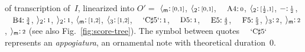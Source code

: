 \begin{example}
of transcription of~$I$,
linearized into
$O' =$
$\langle_{\mathsf{m}}\mathpunct{:}{\scriptstyle [0,1]}$,
$\langle_{2}\mathpunct{:}{\scriptstyle [0,1]}$,
$\mbox{\footnotesize A4}\tstamp{0}$,
$\langle_{2}\mathpunct{:}{\scriptstyle [\frac{1}{2},1]}$,
$-\mathpunct{:}{\scriptstyle \frac{1}{2}}$,
$\mbox{\footnotesize B4}\tstamp{\frac{3}{4}}$,
$\rangle_{2}\mathpunct{:}{\scriptstyle 1}$,
$\rangle_{2}\mathpunct{:}{\scriptstyle 1}$,
$\langle_{\mathsf{m}}\mathpunct{:}{\scriptstyle [1,2]}$,
$\langle_{3}\mathpunct{:}{\scriptstyle [1,2]}$,
$\mbox{\footnotesize `C$\sharp$5`}\tstamp{1}$,
$\mbox{\footnotesize D5}\tstamp{1}$,
$\mbox{\footnotesize E5}\tstamp{\frac{4}{3}}$,
$\mbox{\footnotesize F5}\tstamp{\frac{5}{3}}$,
$\rangle_{3}\mathpunct{:}{\scriptstyle 2}$,
$\rangle_{\mathsf{m}}\mathpunct{:}{\scriptstyle 2}$,
$\rangle_{\mathsf{m}}\mathpunct{:}{\scriptstyle 2}$
(see also Fig.~\ref{fig:score-tree}).
The symbol between quotes $\mbox{\footnotesize `C$\sharp$5`}$
represents an \emph{appogiatura}, %
\ie an ornamental note with theoretical duration~0.
\endex
\end{example}


